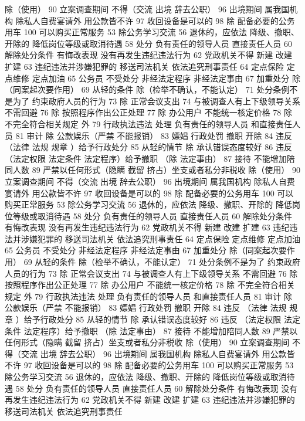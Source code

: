 \documentclass[11pt]{ctexart}
\begin{document}
除（使用）
90 立案调查期间 不得（交流 出境 辞去公职）
96 出境期间 属我国机构 除私人自费宴请外 用公款皆不许
97 收回设备是可以的
98 除 配备必要的公务用车
100 可以购买正常服务
53 除公务学习交流
56 退休的，应依法
降级、撤职、开除的 降低岗位等级或取消待遇
58 处分
负有责任的领导人员
直接责任人员
60 解除处分条件
有悔改表现
没有再发生违纪违法行为
62 党政机关不得
新建 改建 扩建
63 违纪违法并涉嫌犯罪的
移送司法机关
依法追究刑事责任
64 定点保险 定点维修 定点加油
65 公务员 不受处分
非经法定程序
非经法定事由
67 加重处分
除（同案起次要作用）
69 从轻的条件
除（检举不确认，不能认定）
71 处分条例不是为了
约束政府人员的行为
73 除 正常会议支出
74 与被调查人有上下级领导关系 不需回避
76 除 按照程序作出公正处理
77 除 办公用户
不能统一核定价格
78 除 不完全符合相关规定 外
79 行政执法违法 处理
负有责任的领导人员
和直接责任人员
81 审计
除 公款娱乐（严禁 不能报销）
83 嫖娼 行政处罚
撤职 开除
84 违反 （法律 法规 规章 ）给予行政处分
85 从轻的情节
除 承认错误态度较好
86 违反 （法定权限 法定条件 法定程序）给予撤职
（除 法定事由）
87 接待 不能增加陪同人数
89 严禁以任何形式（隐瞒 截留 挤占）坐支或者私分非税收
除（使用）
90 立案调查期间 不得（交流 出境 辞去公职）
96 出境期间 属我国机构 除私人自费宴请外 用公款皆不许
97 收回设备是可以的
98 除 配备必要的公务用车
100 可以购买正常服务
53 除公务学习交流
56 退休的，应依法
降级、撤职、开除的 降低岗位等级或取消待遇
58 处分
负有责任的领导人员
直接责任人员
60 解除处分条件
有悔改表现
没有再发生违纪违法行为
62 党政机关不得
新建 改建 扩建
63 违纪违法并涉嫌犯罪的
移送司法机关
依法追究刑事责任
64 定点保险 定点维修 定点加油
65 公务员 不受处分
非经法定程序
非经法定事由
67 加重处分
除（同案起次要作用）
69 从轻的条件
除（检举不确认，不能认定）
71 处分条例不是为了
约束政府人员的行为
73 除 正常会议支出
74 与被调查人有上下级领导关系 不需回避
76 除 按照程序作出公正处理
77 除 办公用户
不能统一核定价格
78 除 不完全符合相关规定 外
79 行政执法违法 处理
负有责任的领导人员
和直接责任人员
81 审计
除 公款娱乐（严禁 不能报销）
83 嫖娼 行政处罚
撤职 开除
84 违反 （法律 法规 规章 ）给予行政处分
85 从轻的情节
除 承认错误态度较好
86 违反 （法定权限 法定条件 法定程序）给予撤职
（除 法定事由）
87 接待 不能增加陪同人数
89 严禁以任何形式（隐瞒 截留 挤占）坐支或者私分非税收
除（使用）
90 立案调查期间 不得（交流 出境 辞去公职）
96 出境期间 属我国机构 除私人自费宴请外 用公款皆不许
97 收回设备是可以的
98 除 配备必要的公务用车
100 可以购买正常服务
53 除公务学习交流
56 退休的，应依法
降级、撤职、开除的 降低岗位等级或取消待遇
58 处分
负有责任的领导人员
直接责任人员
60 解除处分条件
有悔改表现
没有再发生违纪违法行为
62 党政机关不得
新建 改建 扩建
63 违纪违法并涉嫌犯罪的
移送司法机关
依法追究刑事责任
\end{document}
